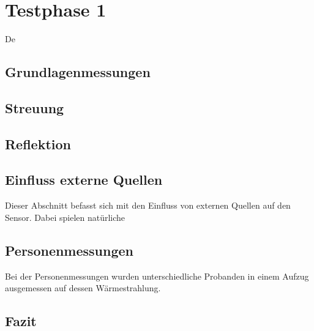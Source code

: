 \chapter{Testphase 1}
\label{chap:Testphasen}

De

\section{Grundlagenmessungen}



\section{Streuung}


\section{Reflektion}


\section{Einfluss externe Quellen}

Dieser Abschnitt befasst sich mit den Einfluss von externen Quellen auf den Sensor. Dabei spielen natürliche 



\section{Personenmessungen}
Bei der Personenmessungen wurden unterschiedliche Probanden in einem Aufzug ausgemessen auf dessen Wärmestrahlung.

















\section{Fazit}